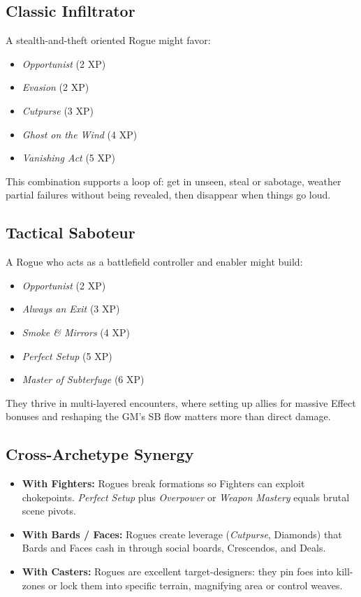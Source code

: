 \documentclass[11pt]{book}
\begin{document}
\subsection{Classic Infiltrator}

A stealth-and-theft oriented Rogue might favor:
\begin{itemize}
  \item \emph{Opportunist} (2 XP)
  \item \emph{Evasion} (2 XP)
  \item \emph{Cutpurse} (3 XP)
  \item \emph{Ghost on the Wind} (4 XP)
  \item \emph{Vanishing Act} (5 XP)
\end{itemize}

This combination supports a loop of:
get in unseen, steal or sabotage, weather partial failures
without being revealed, then disappear when things go loud.

\subsection{Tactical Saboteur}

A Rogue who acts as a battlefield controller and enabler might build:
\begin{itemize}
  \item \emph{Opportunist} (2 XP)
  \item \emph{Always an Exit} (3 XP)
  \item \emph{Smoke \& Mirrors} (4 XP)
  \item \emph{Perfect Setup} (5 XP)
  \item \emph{Master of Subterfuge} (6 XP)
\end{itemize}

They thrive in multi-layered encounters, where setting up allies
for massive Effect bonuses and reshaping the GM's SB flow matters
more than direct damage.

\subsection{Cross-Archetype Synergy}

\begin{itemize}
  \item \textbf{With Fighters:} Rogues break formations so Fighters can
        exploit chokepoints. \emph{Perfect Setup} plus \emph{Overpower}
        or \emph{Weapon Mastery} equals brutal scene pivots.
  \item \textbf{With Bards / Faces:} Rogues create leverage
        (\emph{Cutpurse}, Diamonds) that Bards and Faces cash in through
        social boards, Crescendos, and Deals.
  \item \textbf{With Casters:} Rogues are excellent target-designers:
        they pin foes into kill-zones or lock them into specific terrain,
        magnifying area or control weaves.
\end{itemize}
\end{document}
